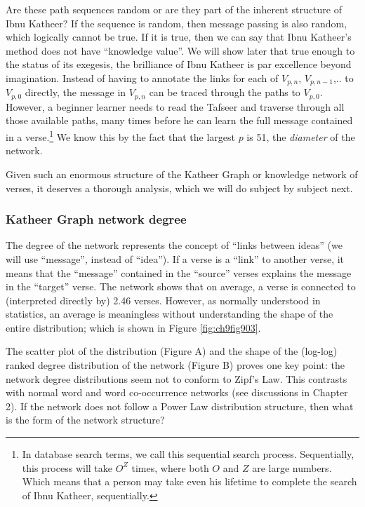 \documentclass[
]{article}
\begin{document}
Are these path sequences random or are they part of the inherent structure of Ibnu Katheer? If the sequence is random, then message passing is also random, which logically cannot be true. If it is true, then we can say that Ibnu Katheer's method does not have ``knowledge value''. We will show later that true enough to the status of its exegesis, the brilliance of Ibnu Katheer is par excellence beyond imagination. Instead of having to annotate the links for each of \(V_{p,n}\), \(V_{p,n-1}\),.. to \(V_{p,0}\) directly, the message in \(V_{p,n}\) can be traced through the paths to \(V_{p,0}\). However, a beginner learner needs to read the Tafseer and traverse through all those available paths, many times before he can learn the full message contained in a verse.\footnote{In database search terms, we call this sequential search process. Sequentially, this process will take \(O^Z\) times, where both \(O\) and \(Z\) are large numbers. Which means that a person may take even his lifetime to complete the search of Ibnu Katheer, sequentially.} We know this by the fact that the largest \(p\) is 51, the \emph{diameter} of the network.

Given such an enormous structure of the Katheer Graph or knowledge network of verses, it deserves a thorough analysis, which we will do subject by subject next.

\hypertarget{katheer-graph-network-degree}{%
\subsubsection{Katheer Graph network degree}\label{katheer-graph-network-degree}}

The degree of the network represents the concept of ``links between ideas'' (we will use ``message'', instead of ``idea''). If a verse is a ``link'' to another verse, it means that the ``message'' contained in the ``source'' verses explains the message in the ``target'' verse. The network shows that on average, a verse is connected to (interpreted directly by) 2.46 verses. However, as normally understood in statistics, an average is meaningless without understanding the shape of the entire distribution; which is shown in Figure \ref{fig:ch9fig903}.

The scatter plot of the distribution (Figure A) and the shape of the (log-log) ranked degree distribution of the network (Figure B) proves one key point: the network degree distributions seem not to conform to Zipf's Law. This contrasts with normal word and word co-occurrence networks (see discussions in Chapter 2). If the network does not follow a Power Law distribution structure, then what is the form of the network structure?
\end{document}
